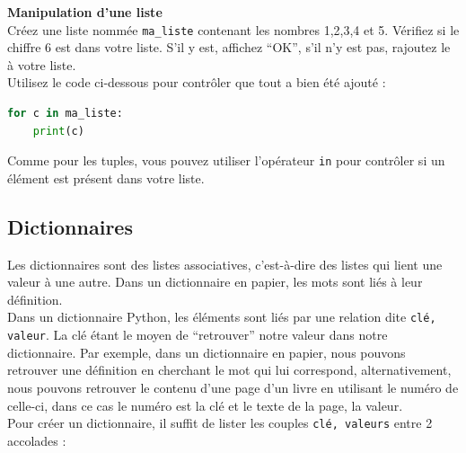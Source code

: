     \begin{Exercice}[5 minutes] \textbf{Manipulation d'une liste}\\
       Créez une liste nommée \lstinline{ma_liste} contenant les nombres 1,2,3,4 et 5. Vérifiez si le chiffre 6 est dans votre liste. S'il y est, affichez ``OK'', s'il n'y est pas, rajoutez le à votre liste. \\
       
       Utilisez le code ci-dessous pour contrôler que tout a bien été ajouté : \\
       
       \begin{lstlisting}[language=Python]
for c in ma_liste:
    print(c)   \end{lstlisting}
    
        \begin{conseil}
            Comme pour les tuples, vous pouvez utiliser l'opérateur \lstinline{in} pour contrôler si un élément est présent dans votre liste.
        \end{conseil}
        
        \begin{solution}
             
        \end{solution}
    \end{Exercice}

	\subsection{Dictionnaires}
	Les dictionnaires sont des listes associatives, c’est-à-dire des listes qui lient une valeur à une autre. Dans un dictionnaire en papier, les mots sont liés à leur définition. \\
	
	Dans un dictionnaire Python, les éléments sont liés par une relation dite \lstinline{clé, valeur}. La clé étant le moyen de “retrouver” notre valeur dans notre dictionnaire. Par exemple, dans un dictionnaire en papier, nous pouvons retrouver une définition en cherchant le mot qui lui correspond, alternativement, nous pouvons retrouver le contenu d’une page d’un livre en utilisant le numéro de celle-ci, dans ce cas le numéro est la clé et le texte de la page, la valeur. \\
	
	Pour créer un dictionnaire, il suffit de lister les couples \lstinline{clé, valeurs} entre 2 accolades : \\
	
